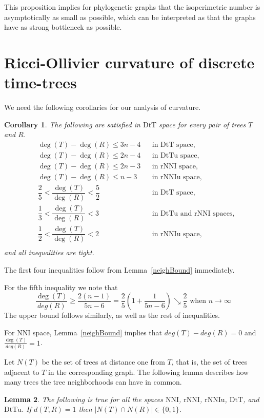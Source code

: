 \documentclass{amsart}
\newtheorem{lemma}{Lemma}
\newtheorem{corollary}[lemma]{Corollary}
\theoremstyle{definition}
\newcommand{\nni}{\mathrm{NNI}}
\newcommand{\rnni}{\mathrm{rNNI}}
\newcommand{\rnniu}{\mathrm{rNNIu}}
\newcommand{\mdts}{\mathrm{DtT}}
\newcommand{\mdtsu}{\mathrm{DtTu}}
\begin{document}
This proposition implies for phylogenetic graphs that the isoperimetric number is asymptotically as small as possible, which can be interpreted as that the graphs have as strong bottleneck as possible.


\section{Ricci-Ollivier curvature of discrete time-trees}

We need the following corollaries for our analysis of curvature.

\begin{corollary}\label{degreeBounds}
The following are satisfied in $\mdts$ space for every pair of trees $T$ and $R$.
\begin{align*}
& \deg(T)-\deg(R) \leq 3n-4		&& \mbox{in $\mdts$ space,}\\
& \deg(T)-\deg(R) \leq 2n-4		&& \mbox{in $\mdtsu$ space,}\\
& \deg(T)-\deg(R) \leq 2n-3		&& \mbox{in $\rnni$ space,}\\
& \deg(T)-\deg(R) \leq n-3			&& \mbox{in $\rnniu$ space,}\\
& \dfrac25 < \dfrac{\deg(T)}{\deg(R)} < \dfrac52		&& \mbox{in $\mdts$ space,}\\
& \dfrac13 < \dfrac{\deg(T)}{\deg(R)} < 3			&& \mbox{in $\mdtsu$ and $\rnni$ spaces,}\\
& \dfrac12 < \dfrac{\deg(T)}{\deg(R)} < 2			&& \mbox{in $\rnniu$ space,}\\
\end{align*}
and all inequalities are tight.
\end{corollary}

\proof
The first four inequalities follow from Lemma~\ref{neighBound} immediately.

For the fifth inequality we note that
\[
\frac{\deg(T)}{deg(R)} \geq \frac{2(n-1)}{5n-6} = \frac25 \left(1 + \frac{1}{5n-6}\right) \searrow \frac 25 \mbox{ when } n\to\infty
\]
The upper bound follows similarly, as well as the rest of inequalities.
\endproof

For $\nni$ space, Lemma~\ref{neighBound} implies that $deg(T)-deg(R) = 0$ and $\frac{\deg(T)}{deg(R)} = 1$.

Let $N(T)$ be the set of trees at distance one from $T$, that is, the set of trees adjacent to $T$ in the corresponding graph.
The following lemma describes how many trees the tree neighborhoods can have in common.

\begin{lemma}\label{intersecNeighb}
The following is true for all the spaces $\nni$, $\rnni$, $\rnniu$, $\mdts$, and $\mdtsu$.
If $d(T,R) = 1$ then $|N(T)\cap N(R)|\in\{0,1\}$.
\end{lemma}
\end{document}

